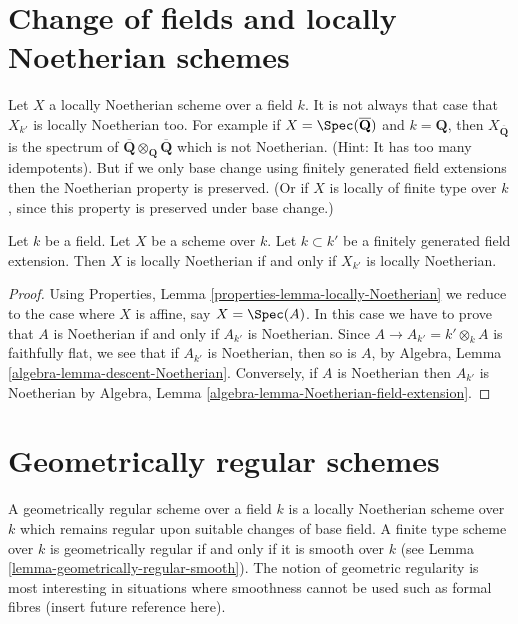 \section{Change of fields and locally Noetherian schemes}
\label{section-locally-Noetherian}

\noindent
Let $X$ a locally Noetherian scheme over a field $k$.
It is not always that case that $X_{k'}$ is locally Noetherian too.
For example if $X = \Spec(\overline{\mathbf{Q}})$ and
$k = \mathbf{Q}$, then $X_{\overline{\mathbf{Q}}}$ is the spectrum
of $\overline{\mathbf{Q}} \otimes_{\mathbf{Q}} \overline{\mathbf{Q}}$
which is not Noetherian. (Hint: It has too many idempotents).
But if we only base change using finitely generated field extensions
then the Noetherian property is preserved. (Or if $X$ is locally of finite
type over $k$, since this property is preserved under base change.)

\begin{lemma}
\label{lemma-locally-Noetherian-base-change}
Let $k$ be a field.
Let $X$ be a scheme over $k$.
Let $k \subset k'$ be a finitely generated field extension.
Then $X$ is locally Noetherian if and only if $X_{k'}$ is locally
Noetherian.
\end{lemma}

\begin{proof}
Using Properties, Lemma \ref{properties-lemma-locally-Noetherian}
we reduce to the case where $X$ is
affine, say $X = \Spec(A)$. In this case we have to prove that
$A$ is Noetherian if and only if $A_{k'}$ is Noetherian.
Since $A \to A_{k'} = k' \otimes_k A$ is faithfully flat, we see
that if $A_{k'}$ is Noetherian, then so is $A$, by
Algebra, Lemma \ref{algebra-lemma-descent-Noetherian}.
Conversely, if $A$ is Noetherian then $A_{k'}$ is Noetherian by
Algebra, Lemma \ref{algebra-lemma-Noetherian-field-extension}.
\end{proof}







\section{Geometrically regular schemes}
\label{section-geometrically-regular}

\noindent
A geometrically regular scheme over a field $k$ is a locally Noetherian
scheme over $k$ which remains regular upon suitable changes of base field.
A finite type scheme over $k$ is geometrically regular if and only
if it is smooth over $k$ (see Lemma \ref{lemma-geometrically-regular-smooth}).
The notion of geometric regularity is most interesting in situations
where smoothness cannot be used such as formal fibres (insert future
reference here).


